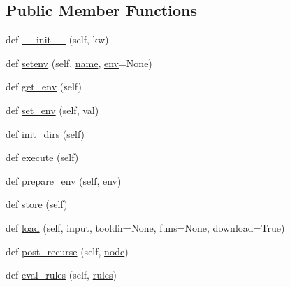 \subsection*{Public Member Functions}
\begin{DoxyCompactItemize}
\item 
def \hyperlink{classwaflib_1_1_configure_1_1_configuration_context_a0f139855aa53920d6f30a05e10253ab0}{\+\_\+\+\_\+init\+\_\+\+\_\+} (self, kw)
\item 
def \hyperlink{classwaflib_1_1_configure_1_1_configuration_context_a2ed4960105cdf08c13cd178367ae1818}{setenv} (self, \hyperlink{lib_2expat_8h_a1b49b495b59f9e73205b69ad1a2965b0}{name}, \hyperlink{classwaflib_1_1_configure_1_1_configuration_context_a390267f6d3529fe07447ffb4925ca533}{env}=None)
\item 
def \hyperlink{classwaflib_1_1_configure_1_1_configuration_context_a5f2dfad34690147826b09413246140f7}{get\+\_\+env} (self)
\item 
def \hyperlink{classwaflib_1_1_configure_1_1_configuration_context_ad30b269279dd9c24e6d892bb3b2fc583}{set\+\_\+env} (self, val)
\item 
def \hyperlink{classwaflib_1_1_configure_1_1_configuration_context_a782925b68e221c10f8e08433329364c9}{init\+\_\+dirs} (self)
\item 
def \hyperlink{classwaflib_1_1_configure_1_1_configuration_context_a2dadcc441cc31bb49159c709bae0ec32}{execute} (self)
\item 
def \hyperlink{classwaflib_1_1_configure_1_1_configuration_context_a913063288a6135c3105acf180e7f0f0c}{prepare\+\_\+env} (self, \hyperlink{classwaflib_1_1_configure_1_1_configuration_context_a390267f6d3529fe07447ffb4925ca533}{env})
\item 
def \hyperlink{classwaflib_1_1_configure_1_1_configuration_context_aadaed27da973f44dde6eaa890026be35}{store} (self)
\item 
def \hyperlink{classwaflib_1_1_configure_1_1_configuration_context_ae13e6fac1db3060edb50337f97b7be3f}{load} (self, input, tooldir=None, funs=None, download=True)
\item 
def \hyperlink{classwaflib_1_1_configure_1_1_configuration_context_a9620736938604c56dc26964b06a24e2e}{post\+\_\+recurse} (self, \hyperlink{structnode}{node})
\item 
def \hyperlink{classwaflib_1_1_configure_1_1_configuration_context_af1b5fdd6d958f8b996dba916c44ec9fa}{eval\+\_\+rules} (self, \hyperlink{classwaflib_1_1_configure_1_1_configuration_context_a279ad5a7c2630c4416afc36cad85a2db}{rules})

\end{DoxyCompactItemize}
